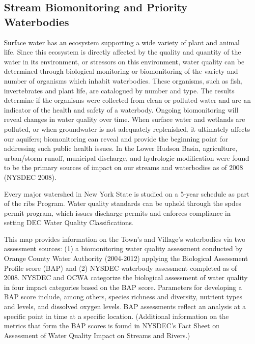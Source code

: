 \label{map:streamclassifications}

\subsection*{Stream Biomonitoring and Priority 
Waterbodies}\label{subsec:streambiomonitoring}
Surface water has an ecosystem supporting a wide variety of plant and animal 
life. Since this ecosystem is directly affected by the quality and quantity of 
the water in its environment, or stressors on this environment, water quality 
can be determined through biological monitoring or biomonitoring of the variety 
and number of organisms which inhabit waterbodies. These organisms, such as 
fish, invertebrates and plant life, are catalogued by number and type. The 
results determine if the organisms were collected from clean or polluted water 
and are an indicator of the health and safety of a waterbody. Ongoing 
biomonitoring will reveal changes in water quality over time. When surface 
water and wetlands are polluted, or when groundwater is not adequately 
replenished, it ultimately affects our aquifers; biomonitoring can reveal and 
provide the beginning point for addressing such public health issues. In the 
Lower Hudson Basin, agriculture, urban/storm runoff, municipal discharge, and 
hydrologic modification were found to be the primary sources of impact on our 
streams and waterbodies as of 2008 (NYSDEC 2008).

Every major watershed in New York State is studied on a 5-year schedule as part 
of the \gls{ribs} Program. Water quality standards can be upheld through the 
\gls{spdes} permit program, which issues discharge permits and enforces 
compliance in setting DEC Water Quality Classifications.

This map provides information on the Town's and Village's waterbodies via two 
assessment sources: (1) a biomonitoring water quality assessment conducted by 
Orange County Water Authority (2004-2012) applying the Biological Assessment 
Profile score (BAP) and (2) NYSDEC waterbody assessment completed as of 2008.  
NYSDEC and OCWA categorize the biological assessment of water quality in four 
impact categories based on the BAP score. Parameters for developing a BAP score 
include, among others, species richness and diversity, nutrient types and 
levels, and dissolved oxygen levels. BAP assessments reflect an analysis at a 
specific point in time at a specific location. (Additional information on the 
metrics that form the BAP scores is found in NYSDEC's Fact Sheet on Assessment 
of Water Quality Impact on Streams and Rivers.) 

